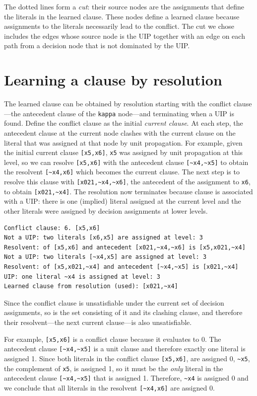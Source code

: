 \documentclass[11pt]{report}
\newcommand*{\p}[1]{\textup{\texttt{#1}}}
\begin{document}
The dotted lines form a \emph{cut}: their source nodes are the
assignments that define the literals in the learned clause. These nodes
define a learned clause because assignments to the literals necessarily
lead to the conflict. The cut we chose includes the edges whose source
node is the UIP together with an edge on each path from a decision node
that is not dominated by the UIP.

\newpage

\section{Learning a clause by resolution}\label{learned.res}

The learned clause can be obtained by resolution starting with the
conflict clause---the antecedent clause of the \p{kappa} node---and
terminating when a UIP is found. Define the conflict clause as the
initial \emph{current clause}. At each step, the antecedent clause at
the current node clashes with the current clause on the literal that was
assigned at that node by unit propagation. For example, given the
initial current clause \verb+[x5,x6]+, \p{x5} was assigned by unit
propagation at this level, so we can resolve \verb+[x5,x6]+ with the
antecedent clause \verb+[~x4,~x5]+ to obtain the resolvent
\verb+[~x4,x6]+ which becomes the current clause. The next step is to
resolve this clause with \verb+[x021,~x4,~x6]+, the antecedent of the
assignment to \p{x6}, to obtain \verb+[x021,~x4]+. The resolution now
terminates because clause is associated with a UIP: there is one
(implied) literal assigned at the current level and the other literals
were assigned by decision assignments at lower levels.

\begin{verbatim}
Conflict clause: 6. [x5,x6]
Not a UIP: two literals [x6,x5] are assigned at level: 3
Resolvent: of [x5,x6] and antecedent [x021,~x4,~x6] is [x5,x021,~x4]
Not a UIP: two literals [~x4,x5] are assigned at level: 3
Resolvent: of [x5,x021,~x4] and antecedent [~x4,~x5] is [x021,~x4]
UIP: one literal ~x4 is assigned at level: 3
Learned clause from resolution (used): [x021,~x4]
\end{verbatim}

Since the conflict clause is unsatisfiable under the current set of
decision assignments, so is the set consisting of it and its clashing
clause, and therefore their resolvent---the next current clause---is
also unsatisfiable.

For example, \verb+[x5,x6]+ is a conflict clause because it evaluates to
0. The antecedent clause \verb+[~x4,~x5]+ is a unit clause and therefore
exactly one literal is assigned 1. Since both literals in the conflict
clause \verb+[x5,x6]+, are assigned 0, \verb+~x5+, the complement of
\verb+x5+, is assigned 1, so it must be the \emph{only} literal in the
antecedent clause \verb+[~x4,~x5]+ that is assigned 1. Therefore,
\verb+~x4+ is assigned 0 and we conclude that all literals in the
resolvent \verb+[~x4,x6]+ are assigned 0.
\end{document}
